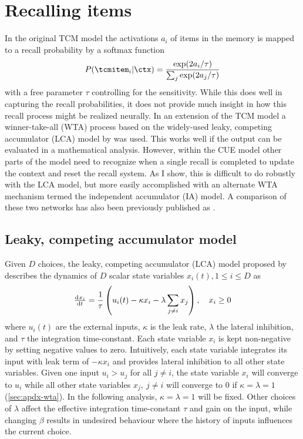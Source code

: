 \chapter{Recalling items}\label{sec:recall}
In the original TCM model \parencite{Howard2002} the activations $a_i$ of items in the memory is mapped to a recall probability by a softmax function
\begin{equation}
    P(\tcmitem_i | \ctx) = \frac{\exp(2a_i/\tau)}{\sum_j \exp(2a_j/\tau)}
\end{equation}
with a free parameter $\tau$ controlling for the sensitivity.
While this does well in capturing the recall probabilities, it does not provide much insight in how this recall process might be realized neurally.
In an extension of the TCM model \parencite{Sederberg2008} a winner-take-all (WTA) process based on the widely-used leaky, competing accumulator (LCA) model by \textcite{Usher2001} was used.
This works well if the output can be evaluated in a mathematical analysis.
However, within the CUE model other parts of the model need to recognize when a single recall is completed to update the context and reset the recall system.
As I show, this is difficult to do robustly with the LCA model, but more easily accomplished with an alternate WTA mechanism termed the independent accumulator (IA) model.
A comparison of these two networks has also been previously published as \textcite{jangosmann2017}.


\section{Leaky, competing accumulator model}
Given $D$ choices, the leaky, competing accumulator (LCA) model proposed by \textcite{Usher2001} describes the dynamics of $D$ scalar state variables $x_i(t), 1 \leq i \leq D$ as
\begin{equation}
    \od{x_i}{t} = \frac{1}{\tau} \del{u_i(t) -\kappa x_i - \lambda \sum_{j \neq i} x_j}, \quad x_i \geq 0 \label{eqn:lca}
\end{equation}
where $u_i(t)$ are the external inputs, $\kappa$ is the leak rate, $\lambda$ the lateral inhibition, and $\tau$ the integration time-constant.
Each state variable $x_i$ is kept non-negative by setting negative values to zero.
Intuitively, each state variable integrates its input with leak term of $-\kappa x_i$ and provides lateral inhibition to all other state variables.
Given one input $u_i > u_j$ for all $j \neq i$, the state variable $x_i$ will converge to $u_i$ while all other state variables $x_j,\ j \neq i$ will converge to $0$ if $\kappa = \lambda = 1$ (\cref{sec:apdx-wta}).
In the following analysis, $\kappa = \lambda = 1$ will be fixed.
Other choices of $\lambda$ affect the effective integration time-constant $\tau$ and gain on the input, while changing $\beta$ results in undesired behaviour where the history of inputs influences the current choice.

